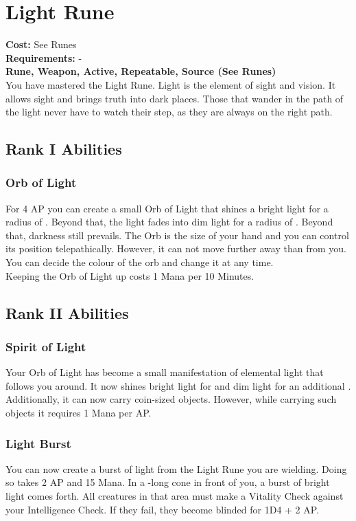 \section{Light Rune}\label{rune:light}
\textbf{Cost:} See Runes\\
\textbf{Requirements:} -\\
\textbf{Rune, Weapon, Active, Repeatable, Source (See Runes)}\\
You have mastered the Light Rune.
Light is the element of sight and vision.
It allows sight and brings truth into dark places.
Those that wander in the path of the light never have to watch their step, as they are always on the right path.

\subsection{Rank I Abilities}

\subsubsection{Orb of Light}
For 4 AP you can create a small Orb of Light that shines a bright light for a radius of .
Beyond that, the light fades into dim light for a radius of .
Beyond that, darkness still prevails.
The Orb is the size of your hand and you can control its position telepathically.
However, it can not move further away than  from you.
You can decide the colour of the orb and change it at any time. \\
Keeping the Orb of Light up costs 1 Mana per 10 Minutes.


\subsection{Rank II Abilities}

\subsubsection{Spirit of Light}
Your Orb of Light has become a small manifestation of elemental light that follows you around.
It now shines bright light for  and dim light for an additional .\\
Additionally, it can now carry coin-sized objects.
However, while carrying such objects it requires 1 Mana per AP.

\subsubsection{Light Burst}
You can now create a burst of light from the Light Rune you are wielding.
Doing so takes 2 AP and 15 Mana.
In a -long cone in front of you, a burst of bright light comes forth.
All creatures in that area must make a Vitality Check against your Intelligence Check.
If they fail, they become blinded for 1D4 + 2 AP.

